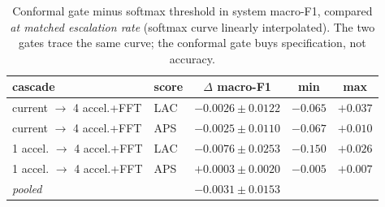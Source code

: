\begin{table}[t]
\centering\footnotesize\setlength{\tabcolsep}{4pt}
\caption{Conformal gate minus softmax threshold in system macro-F1, compared
\emph{at matched escalation rate} (softmax curve linearly interpolated).
The two gates trace the same curve; the conformal gate buys specification,
not accuracy.}
\label{tab:gate}
\begin{tabular}{llccc}
\toprule
cascade & score & $\Delta$ macro-F1 & min & max \\
\midrule
current $\rightarrow$ 4 accel.+FFT & LAC & $-0.0026 \pm 0.0122$ & $-0.065$ & $+0.037$ \\
current $\rightarrow$ 4 accel.+FFT & APS & $-0.0025 \pm 0.0110$ & $-0.067$ & $+0.010$ \\
1 accel. $\rightarrow$ 4 accel.+FFT & LAC & $-0.0076 \pm 0.0253$ & $-0.150$ & $+0.026$ \\
1 accel. $\rightarrow$ 4 accel.+FFT & APS & $+0.0003 \pm 0.0020$ & $-0.005$ & $+0.007$ \\
\midrule
\multicolumn{2}{l}{\emph{pooled}} & $-0.0031 \pm 0.0153$ & & \\
\bottomrule
\end{tabular}
\end{table}

